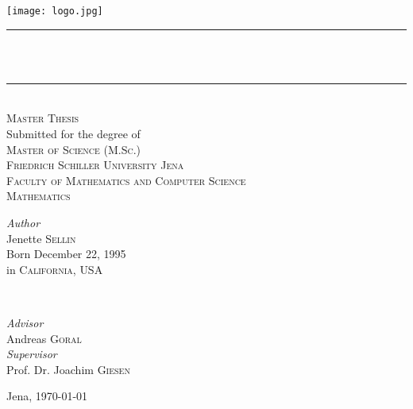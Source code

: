 \begin{titlepage}

\newcommand{\HRule}{\rule{\linewidth}{0.5mm}}

\center

\texttt{[image: logo.jpg]}\\[0.5cm]

\HRule \\[0.4cm]
{ \huge \bfseries \ttitle}\\[0.4cm]
\HRule \\[1.0cm]
 
\textsc{\LARGE Master Thesis}\\[0.5cm]
{\Large Submitted for the degree of\\[0.2cm]
\textsc{Master of Science (M.Sc.)}}\\[1.0cm]

\textsc{\LARGE Friedrich Schiller University Jena}\\[0.5cm]
\textsc{\Large Faculty of Mathematics and Computer Science}\\[0.2cm]
\textsc{\large Mathematics}\\[1.0cm]
 
\begin{minipage}[t]{0.4\textwidth}
\begin{flushleft} \large
\emph{Author}\\
Jenette \textsc{Sellin} \\[0.5cm]
Born December 22, 1995 \\
in \textsc{California}, \textsc{USA}
\end{flushleft}
\end{minipage}
~
\begin{minipage}[t]{0.4\textwidth}
\begin{flushright} \large
\emph{Advisor} \\
Andreas \textsc{Goral} \\ [0.5cm]
\emph{Supervisor} \\
Prof. Dr. Joachim \textsc{Giesen} 
\end{flushright}
\end{minipage}

\vspace{8em}
{\large Jena, \today}\\[2cm]
 
\vfill %

\end{titlepage}